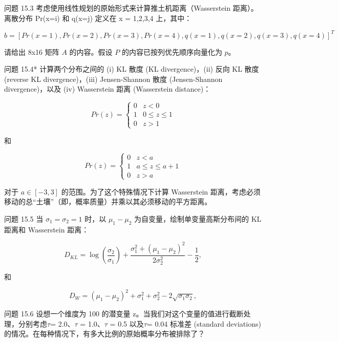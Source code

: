 问题 15.3 考虑使用线性规划的原始形式来计算推土机距离（Wasserstein 距离）。离散分布 Pr(x=i) 和 q(x=j) 定义在 x = 1,2,3,4 上，其中：

\begin{equation}
b = [Pr(x=1), Pr(x=2), Pr(x=3), Pr(x=4), q(x=1), q(x=2), q(x=3), q(x=4)]^T 
\end{equation}

请给出 8x16 矩阵 \(A\) 的内容。假设 \(P\) 的内容已按列优先顺序向量化为 \(p\)。

问题 15.4* 计算两个分布之间的 (i) KL 散度 (KL divergence)，(ii) 反向 KL 散度 (reverse KL divergence)，(iii) Jensen-Shannon 散度 (Jensen-Shannon divergence)，以及 (iv) Wasserstein 距离 (Wasserstein distance)：

\begin{equation}
Pr(z) = \begin{cases}
0 & z < 0 \\
1 & 0 \leq z \leq 1 \\
0 & z > 1
\end{cases}
\end{equation}

和

\begin{equation}
Pr(z) = \begin{cases}
0 & z < a \\
1 & a \leq z \leq a + 1 \\
0 & z > a
\end{cases} 
\end{equation}


对于 \(a \in [-3,3]\) 的范围。为了这个特殊情况下计算 Wasserstein 距离，考虑必须移动的总“土壤”（即，概率质量）并乘以其必须移动的平方距离。

问题 15.5 当 \(\sigma_1 = \sigma_2 = 1\) 时，以 \(\mu_1 - \mu_2\) 为自变量，绘制单变量高斯分布间的 KL 距离和 Wasserstein 距离：

\begin{equation}
D_{KL} = \log \left( \frac{\sigma_2}{\sigma_1} \right) + \frac{\sigma_1^2 + (\mu_1 - \mu_2)^2}{2\sigma_2^2} - \frac{1}{2}, 
\end{equation}

和

\begin{equation}
D_{W} = (\mu_1 - \mu_2)^2 + \sigma_1^2 + \sigma_2^2 - 2\sqrt{\sigma_1\sigma_2}, 
\end{equation}

问题 15.6 设想一个维度为 100 的潜变量 z。当我们对这个变量的值进行截断处理，分别考虑\(\tau\)= 2.0、\(\tau\) = 1.0、\(\tau\) = 0.5 以及\(\tau\)= 0.04 标准差 (standard deviations) 的情况。在每种情况下，有多大比例的原始概率分布被排除了？


